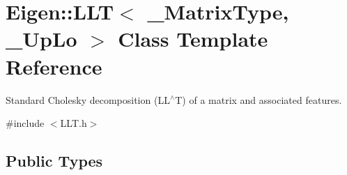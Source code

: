\hypertarget{class_eigen_1_1_l_l_t}{}\section{Eigen\+::L\+LT$<$ \+\_\+\+Matrix\+Type, \+\_\+\+Up\+Lo $>$ Class Template Reference}
\label{class_eigen_1_1_l_l_t}


Standard Cholesky decomposition (L\+L$^\wedge$T) of a matrix and associated features.  




{\ttfamily \#include $<$L\+L\+T.\+h$>$}

\subsection*{Public Types}
